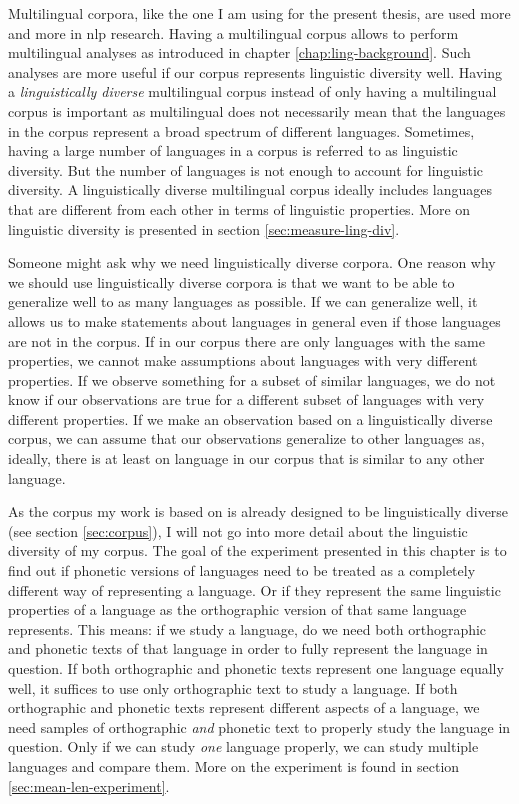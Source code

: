 
\label{chap:mwl}
Multilingual corpora, like the one I am using for the present thesis, are used more and more in \ac{nlp} research. Having a multilingual corpus allows to perform multilingual analyses as introduced in chapter \ref{chap:ling-background}. Such analyses are more useful if our corpus represents linguistic diversity well. Having a \textit{linguistically diverse} multilingual corpus instead of only having a multilingual corpus is important as multilingual does not necessarily mean that the languages in the corpus represent a broad spectrum of different languages. Sometimes, having a large number of languages in a corpus is referred to as linguistic diversity. But the number of languages is not enough to account for linguistic diversity. A linguistically diverse multilingual corpus ideally includes languages that are different from each other in terms of linguistic properties. More on linguistic diversity is presented in section \ref{sec:measure-ling-div}.

Someone might ask why we need linguistically diverse corpora. One reason why we should use linguistically diverse corpora is that we want to be able to generalize well to as many languages as possible. If we can generalize well, it allows us to make statements about languages in general even if those languages are not in the corpus. If in our corpus there are only languages with the same properties, we cannot make assumptions about languages with very different properties. If we observe something for a subset of similar languages, we do not know if our observations are true for a different subset of languages with very different properties. If we make an observation based on a linguistically diverse corpus, we can assume that our observations generalize to other languages as, ideally, there is at least on language in our corpus that is similar to any other language.

As the corpus my work is based on is already designed to be linguistically diverse (see section \ref{sec:corpus}), I will not go into more detail about the linguistic diversity of my corpus. The goal of the experiment presented in this chapter is to find out if phonetic versions of languages need to be treated as a completely different way of representing a language. Or if they represent the same linguistic properties of a language as the orthographic version of that same language represents. This means: if we study a language, do we need both orthographic and phonetic texts of that language in order to fully represent the language in question. If both orthographic and phonetic texts represent one language equally well, it suffices to use only orthographic text to study a language. If both orthographic and phonetic texts represent different aspects of a language, we need samples of orthographic \textit{and} phonetic text to properly study the language in question. Only if we can study \textit{one} language properly, we can study multiple languages and compare them. More on the experiment is found in section \ref{sec:mean-len-experiment}.

